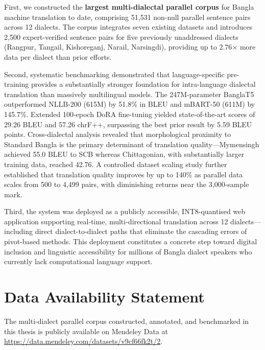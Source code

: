 \documentclass[12pt,a4paper]{article}
\begin{document}
First, we constructed the \textbf{largest multi-dialectal parallel corpus} for Bangla machine translation to date, comprising 51,531 non-null parallel sentence pairs across 12 dialects. The corpus integrates seven existing datasets and introduces 2,500 expert-verified sentence pairs for five previously unaddressed dialects (Rangpur, Tangail, Kishoreganj, Narail, Narsingdi), providing up to 2.76$\times$ more data per dialect than prior efforts.

Second, systematic benchmarking demonstrated that language-specific pre-training provides a substantially stronger foundation for intra-language dialectal translation than massively multilingual models. The 247M-parameter BanglaT5 outperformed NLLB-200 (615M) by 51.8\% in BLEU and mBART-50 (611M) by 145.7\%. Extended 100-epoch DoRA fine-tuning yielded state-of-the-art scores of 29.26 BLEU and 57.26 chrF++, surpassing the best prior result \cite{mahjabin2025banglachq} by 5.59 BLEU points. Cross-dialectal analysis revealed that morphological proximity to Standard Bangla is the primary determinant of translation quality---Mymensingh achieved 55.0 BLEU to SCB whereas Chittagonian, with substantially larger training data, reached 42.76. A controlled dataset scaling study further established that translation quality improves by up to 140\% as parallel data scales from 500 to 4,499 pairs, with diminishing returns near the 3,000-sample mark.

Third, the system was deployed as a publicly accessible, INT8-quantised web application supporting real-time, multi-directional translation across 12 dialects---including direct dialect-to-dialect paths that eliminate the cascading errors of pivot-based methods. This deployment constitutes a concrete step toward digital inclusion and linguistic accessibility for millions of Bangla dialect speakers who currently lack computational language support.

\section*{Data Availability Statement}
The multi-dialect parallel corpus constructed, annotated, and benchmarked in this thesis is publicly available on Mendeley Data at \url{https://data.mendeley.com/datasets/v9cf66fk2t/2}.



\end{document}
